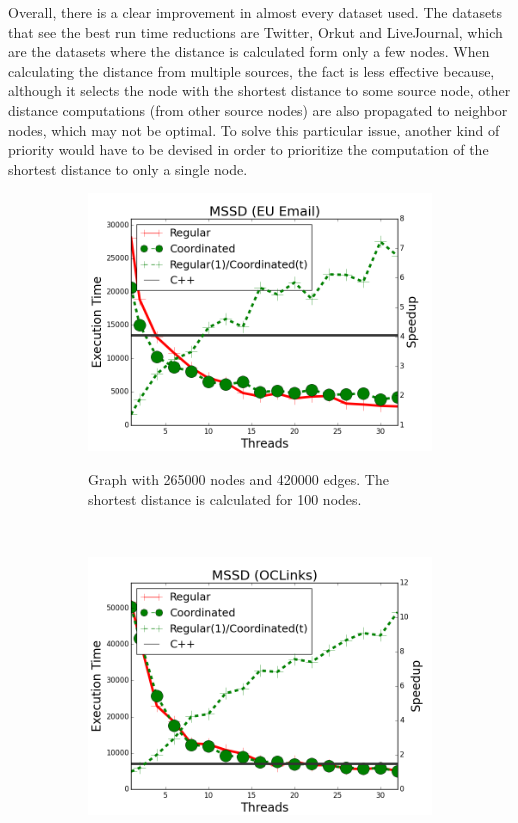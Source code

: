 Overall, there is a clear improvement in almost every dataset used. The datasets
that see the best run time reductions are Twitter, Orkut and LiveJournal, which
are the datasets where the distance is calculated form only a few nodes. When
calculating the distance from multiple sources, the  fact is
less effective because, although it selects the node with the shortest distance
to some source node, other distance computations (from other source nodes) are
also propagated to neighbor nodes, which may not be optimal. To solve this
particular issue, another kind of priority would have to be devised in order to
prioritize the computation of the shortest distance to only a single node.

\begin{figure}[]
        \centering
        \begin{subfigure}[b]{\plotsize\textwidth}
                \includegraphics[width=\textwidth]{experiments/coordination/cmp-shortest-email.png}
                \label{fig:coordination:coord_sssp_email}
                \caption{Graph with 265000 nodes and 420000 edges. The shortest
                distance is calculated for 100 nodes.}
        \end{subfigure}
        ~
        \begin{subfigure}[b]{\plotsize\textwidth}
                \includegraphics[width=\textwidth]{experiments/coordination/cmp-shortest-oclinks.png}

\end{subfigure}
\end{figure}
